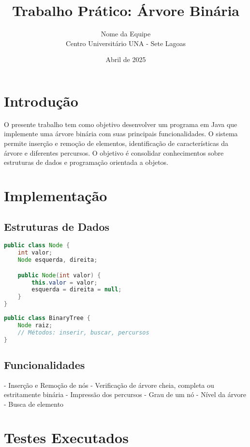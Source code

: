 \documentclass[a4paper,12pt]{article}
\title{Trabalho Prático: Árvore Binária}
\author{Nome da Equipe \\ Centro Universitário UNA - Sete Lagoas}
\date{Abril de 2025}
\begin{document}
\maketitle
\tableofcontents
\newpage

\section{Introdução}

O presente trabalho tem como objetivo desenvolver um programa em Java que implemente uma árvore binária com suas principais funcionalidades. O sistema permite inserção e remoção de elementos, identificação de características da árvore e diferentes percursos. O objetivo é consolidar conhecimentos sobre estruturas de dados e programação orientada a objetos.

\section{Implementação}

\subsection{Estruturas de Dados}

\begin{lstlisting}[language=Java, caption=Classe Node]
public class Node {
    int valor;
    Node esquerda, direita;

    public Node(int valor) {
        this.valor = valor;
        esquerda = direita = null;
    }
}
\end{lstlisting}

\begin{lstlisting}[language=Java, caption=Classe BinaryTree]
public class BinaryTree {
    Node raiz;
    // Métodos: inserir, buscar, percursos
}
\end{lstlisting}

\subsection{Funcionalidades}

- Inserção e Remoção de nós
- Verificação de árvore cheia, completa ou estritamente binária
- Impressão dos percursos
- Grau de um nó
- Nível da árvore
- Busca de elemento

\section{Testes Executados}
\end{document}
